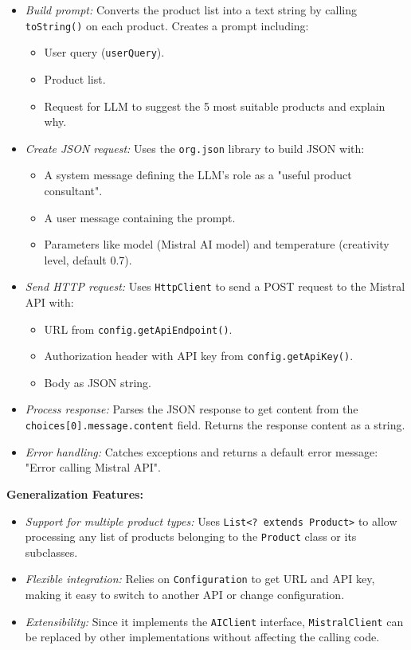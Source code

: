 \documentclass{article}
\begin{document}
\begin{itemize}
    \item \textit{Build prompt:} Converts the product list into a text string by calling \texttt{toString()} on each product. Creates a prompt including:
    \begin{itemize}
        \item User query (\texttt{userQuery}).
        \item Product list.
        \item Request for LLM to suggest the 5 most suitable products and explain why.
    \end{itemize}
    \item \textit{Create JSON request:} Uses the \texttt{org.json} library to build JSON with:
    \begin{itemize}
        \item A system message defining the LLM's role as a "useful product consultant".
        \item A user message containing the prompt.
        \item Parameters like model (Mistral AI model) and temperature (creativity level, default 0.7).
    \end{itemize}
    \item \textit{Send HTTP request:} Uses \texttt{HttpClient} to send a POST request to the Mistral API with:
    \begin{itemize}
        \item URL from \texttt{config.getApiEndpoint()}.
        \item Authorization header with API key from \texttt{config.getApiKey()}.
        \item Body as JSON string.
    \end{itemize}
    \item \textit{Process response:} Parses the JSON response to get content from the \texttt{choices[0].message.content} field. Returns the response content as a string.
    \item \textit{Error handling:} Catches exceptions and returns a default error message: "Error calling Mistral API".
\end{itemize}
\textbf{Generalization Features:}
\begin{itemize}
    \item \textit{Support for multiple product types:} Uses \texttt{List<? extends Product>} to allow processing any list of products belonging to the \texttt{Product} class or its subclasses.
    \item \textit{Flexible integration:} Relies on \texttt{Configuration} to get URL and API key, making it easy to switch to another API or change configuration.
    \item \textit{Extensibility:} Since it implements the \texttt{AIClient} interface, \texttt{MistralClient} can be replaced by other implementations without affecting the calling code.
\end{itemize}
\end{document}
